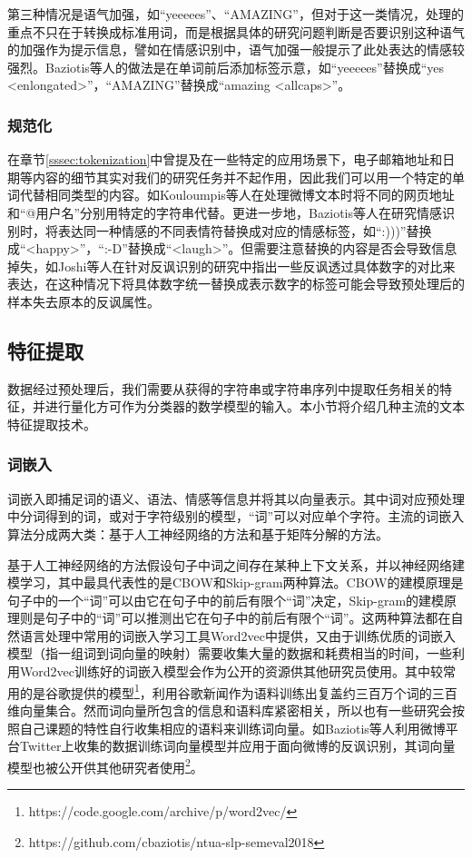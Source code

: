 第三种情况是语气加强，如“yeeeees”、“AMAZING”，但对于这一类情况，处理的重点不只在于转换成标准用词，而是根据具体的研究问题判断是否要识别这种语气的加强作为提示信息，譬如在情感识别中，语气加强一般提示了此处表达的情感较强烈。Baziotis等人\cite{baziotis2017semeval2}的做法是在单词前后添加标签示意，如“yeeeees”替换成“yes <enlongated>”，“AMAZING”替换成“amazing <allcaps>”。

\subsubsection{规范化}

在章节\ref{sssec:tokenization}中曾提及在一些特定的应用场景下，电子邮箱地址和日期等内容的细节其实对我们的研究任务并不起作用，因此我们可以用一个特定的单词代替相同类型的内容。如Kouloumpis等人\cite{kouloumpis2011twitter}在处理微博文本时将不同的网页地址和“@用户名”分别用特定的字符串代替。更进一步地，Baziotis等人\cite{baziotis2017semeval2}在研究情感识别时，将表达同一种情感的不同表情符替换成对应的情感标签，如“:)))”替换成“<happy>”，“:-D”替换成“<laugh>”。但需要注意替换的内容是否会导致信息掉失，如Joshi等人\cite{joshi2015harnessing}在针对反讽识别的研究中指出一些反讽透过具体数字的对比来表达，在这种情况下将具体数字统一替换成表示数字的标签可能会导致预处理后的样本失去原本的反讽属性。

\subsection{特征提取}
\label{ssec:feature_extraction}

数据经过预处理后，我们需要从获得的字符串或字符串序列中提取任务相关的特征，并进行量化方可作为分类器的数学模型的输入。本小节将介绍几种主流的文本特征提取技术。

\subsubsection{词嵌入}
\label{sssec:embedding}

词嵌入即捕足词的语义、语法、情感等信息并将其以向量表示。其中词对应预处理中分词得到的词，或对于字符级别的模型，“词”可以对应单个字符\cite{baziotis2018ntua}。主流的词嵌入算法分成两大类：基于人工神经网络的方法和基于矩阵分解的方法。

基于人工神经网络的方法假设句子中词之间存在某种上下文关系，并以神经网络建模学习，其中最具代表性的是CBOW和Skip-gram两种算法。CBOW的建模原理是句子中的一个“词”可以由它在句子中的前后有限个“词”决定，Skip-gram的建模原理则是句子中的“词”可以推测出它在句子中的前后有限个“词”。这两种算法都在自然语言处理中常用的词嵌入学习工具Word2vec\cite{mikolov2013efficient}中提供，又由于训练优质的词嵌入模型（指一组词到词向量的映射）需要收集大量的数据和耗费相当的时间，一些利用Word2vec训练好的词嵌入模型会作为公开的资源供其他研究员使用。其中较常用的是谷歌提供的模型\footnote{https://code.google.com/archive/p/word2vec/}，利用谷歌新闻作为语料训练出复盖约三百万个词的三百维向量集合。然而词向量所包含的信息和语料库紧密相关，所以也有一些研究会按照自己课题的特性自行收集相应的语料来训练词向量。如Baziotis等人\cite{baziotis2017semeval2}利用微博平台Twitter上收集的数据训练词向量模型并应用于面向微博的反讽识别，其词向量模型也被公开供其他研究者使用\footnote{https://github.com/cbaziotis/ntua-slp-semeval2018}。

